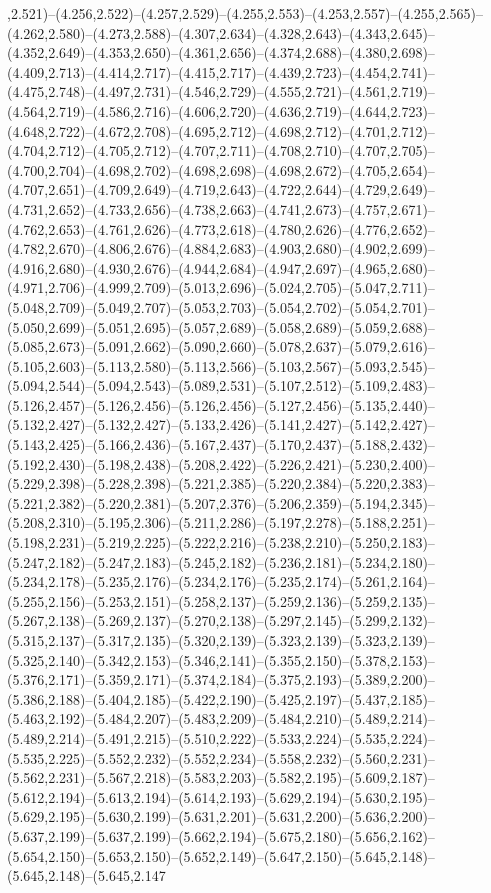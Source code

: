 ,2.521)--(4.256,2.522)--(4.257,2.529)--(4.255,2.553)--(4.253,2.557)--(4.255,2.565)--(4.262,2.580)--(4.273,2.588)--(4.307,2.634)--(4.328,2.643)--(4.343,2.645)--(4.352,2.649)--(4.353,2.650)--(4.361,2.656)--(4.374,2.688)--(4.380,2.698)--(4.409,2.713)--(4.414,2.717)--(4.415,2.717)--(4.439,2.723)--(4.454,2.741)--(4.475,2.748)--(4.497,2.731)--(4.546,2.729)--(4.555,2.721)--(4.561,2.719)--(4.564,2.719)--(4.586,2.716)--(4.606,2.720)--(4.636,2.719)--(4.644,2.723)--(4.648,2.722)--(4.672,2.708)--(4.695,2.712)--(4.698,2.712)--(4.701,2.712)--(4.704,2.712)--(4.705,2.712)--(4.707,2.711)--(4.708,2.710)--(4.707,2.705)--(4.700,2.704)--(4.698,2.702)--(4.698,2.698)--(4.698,2.672)--(4.705,2.654)--(4.707,2.651)--(4.709,2.649)--(4.719,2.643)--(4.722,2.644)--(4.729,2.649)--(4.731,2.652)--(4.733,2.656)--(4.738,2.663)--(4.741,2.673)--(4.757,2.671)--(4.762,2.653)--(4.761,2.626)--(4.773,2.618)--(4.780,2.626)--(4.776,2.652)--(4.782,2.670)--(4.806,2.676)--(4.884,2.683)--(4.903,2.680)--(4.902,2.699)--(4.916,2.680)--(4.930,2.676)--(4.944,2.684)--(4.947,2.697)--(4.965,2.680)--(4.971,2.706)--(4.999,2.709)--(5.013,2.696)--(5.024,2.705)--(5.047,2.711)--(5.048,2.709)--(5.049,2.707)--(5.053,2.703)--(5.054,2.702)--(5.054,2.701)--(5.050,2.699)--(5.051,2.695)--(5.057,2.689)--(5.058,2.689)--(5.059,2.688)--(5.085,2.673)--(5.091,2.662)--(5.090,2.660)--(5.078,2.637)--(5.079,2.616)--(5.105,2.603)--(5.113,2.580)--(5.113,2.566)--(5.103,2.567)--(5.093,2.545)--(5.094,2.544)--(5.094,2.543)--(5.089,2.531)--(5.107,2.512)--(5.109,2.483)--(5.126,2.457)--(5.126,2.456)--(5.126,2.456)--(5.127,2.456)--(5.135,2.440)--(5.132,2.427)--(5.132,2.427)--(5.133,2.426)--(5.141,2.427)--(5.142,2.427)--(5.143,2.425)--(5.166,2.436)--(5.167,2.437)--(5.170,2.437)--(5.188,2.432)--(5.192,2.430)--(5.198,2.438)--(5.208,2.422)--(5.226,2.421)--(5.230,2.400)--(5.229,2.398)--(5.228,2.398)--(5.221,2.385)--(5.220,2.384)--(5.220,2.383)--(5.221,2.382)--(5.220,2.381)--(5.207,2.376)--(5.206,2.359)--(5.194,2.345)--(5.208,2.310)--(5.195,2.306)--(5.211,2.286)--(5.197,2.278)--(5.188,2.251)--(5.198,2.231)--(5.219,2.225)--(5.222,2.216)--(5.238,2.210)--(5.250,2.183)--(5.247,2.182)--(5.247,2.183)--(5.245,2.182)--(5.236,2.181)--(5.234,2.180)--(5.234,2.178)--(5.235,2.176)--(5.234,2.176)--(5.235,2.174)--(5.261,2.164)--(5.255,2.156)--(5.253,2.151)--(5.258,2.137)--(5.259,2.136)--(5.259,2.135)--(5.267,2.138)--(5.269,2.137)--(5.270,2.138)--(5.297,2.145)--(5.299,2.132)--(5.315,2.137)--(5.317,2.135)--(5.320,2.139)--(5.323,2.139)--(5.323,2.139)--(5.325,2.140)--(5.342,2.153)--(5.346,2.141)--(5.355,2.150)--(5.378,2.153)--(5.376,2.171)--(5.359,2.171)--(5.374,2.184)--(5.375,2.193)--(5.389,2.200)--(5.386,2.188)--(5.404,2.185)--(5.422,2.190)--(5.425,2.197)--(5.437,2.185)--(5.463,2.192)--(5.484,2.207)--(5.483,2.209)--(5.484,2.210)--(5.489,2.214)--(5.489,2.214)--(5.491,2.215)--(5.510,2.222)--(5.533,2.224)--(5.535,2.224)--(5.535,2.225)--(5.552,2.232)--(5.552,2.234)--(5.558,2.232)--(5.560,2.231)--(5.562,2.231)--(5.567,2.218)--(5.583,2.203)--(5.582,2.195)--(5.609,2.187)--(5.612,2.194)--(5.613,2.194)--(5.614,2.193)--(5.629,2.194)--(5.630,2.195)--(5.629,2.195)--(5.630,2.199)--(5.631,2.201)--(5.631,2.200)--(5.636,2.200)--(5.637,2.199)--(5.637,2.199)--(5.662,2.194)--(5.675,2.180)--(5.656,2.162)--(5.654,2.150)--(5.653,2.150)--(5.652,2.149)--(5.647,2.150)--(5.645,2.148)--(5.645,2.148)--(5.645,2.147